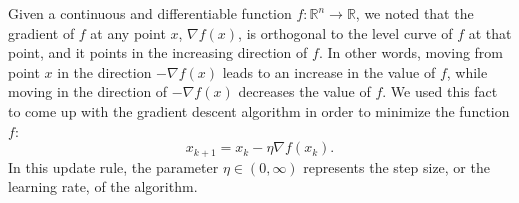 \rm

Given a continuous and differentiable function $f: \mathbb R^n \to \mathbb R$, we noted that the gradient of $f$ at any point $x$, $\nabla f(x)$, is orthogonal to the level curve of $f$ at that point, and it points in the increasing direction of $f$.
In other words, moving from point $x$ in the direction $-\nabla f(x)$ leads to an increase in the value of $f$, while  moving in  the  direction  of $−\nabla f(x)$  decreases  the  value  of $f$.
We used this fact to come up with the gradient descent algorithm in order to minimize the function $f$:
\[ x_{k+1} = x_k - \eta \nabla f(x_k). \]
In this update rule, the parameter $\eta \in (0, \infty)$ represents the step size, or the learning rate, of the algorithm.



